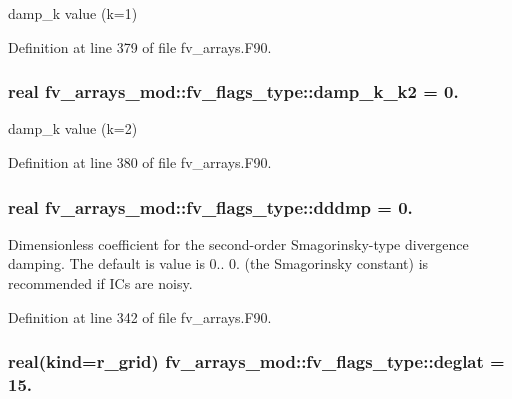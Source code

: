 damp\-\_\-k value (k=1) 



Definition at line 379 of file fv\-\_\-arrays.\-F90.

\subsubsection[{damp\-\_\-k\-\_\-k2}]{\setlength{\rightskip}{0pt plus 5cm}real fv\-\_\-arrays\-\_\-mod\-::fv\-\_\-flags\-\_\-type\-::damp\-\_\-k\-\_\-k2 = 0.}\label{structfv__arrays__mod_1_1fv__flags__type_ad632b60850fd35d3d6a63123d8535802}


damp\-\_\-k value (k=2) 



Definition at line 380 of file fv\-\_\-arrays.\-F90.

\subsubsection[{dddmp}]{\setlength{\rightskip}{0pt plus 5cm}real fv\-\_\-arrays\-\_\-mod\-::fv\-\_\-flags\-\_\-type\-::dddmp = 0.}\label{structfv__arrays__mod_1_1fv__flags__type_abb173832e0f7594d6ac8eca3d1f9ce0a}


Dimensionless coefficient for the second-\/order Smagorinsky-\/type divergence damping. The default is value is 0.. 0. (the Smagorinsky constant) is recommended if I\-Cs are noisy. 



Definition at line 342 of file fv\-\_\-arrays.\-F90.

\subsubsection[{deglat}]{\setlength{\rightskip}{0pt plus 5cm}real(kind={\bf r\-\_\-grid}) fv\-\_\-arrays\-\_\-mod\-::fv\-\_\-flags\-\_\-type\-::deglat = 15.}\label{structfv__arrays__mod_1_1fv__flags__type_a2ec7d7cffa2d1b29a11b25d9b1410af4}



